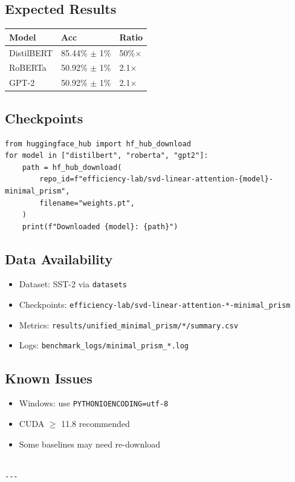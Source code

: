 \subsection{Expected Results}

\begin{table}[H]
\centering
\small
\begin{tabular}{lll}
\toprule
\textbf{Model} & \textbf{Acc} & \textbf{Ratio} \\
\midrule
DistilBERT & 85.44\% $\pm$ 1\% & 50\%$\times$ \\
RoBERTa & 50.92\% $\pm$ 1\% & 2.1$\times$ \\
GPT-2 & 50.92\% $\pm$ 1\% & 2.1$\times$ \\
\bottomrule
\end{tabular}
\end{table}

\subsection{Checkpoints}

\begin{lstlisting}
from huggingface_hub import hf_hub_download
for model in ["distilbert", "roberta", "gpt2"]:
    path = hf_hub_download(
        repo_id=f"efficiency-lab/svd-linear-attention-{model}-minimal_prism",
        filename="weights.pt",
    )
    print(f"Downloaded {model}: {path}")
\end{lstlisting}

\subsection{Data Availability}

\begin{itemize}
\item Dataset: SST-2 via \texttt{datasets}
\item Checkpoints: \texttt{efficiency-lab/svd-linear-attention-*-minimal\_prism}
\item Metrics: \texttt{results/unified\_minimal\_prism/*/summary.csv}
\item Logs: \texttt{benchmark\_logs/minimal\_prism\_*.log}

\end{itemize}
\subsection{Known Issues}

\begin{itemize}
\item Windows: use \texttt{PYTHONIOENCODING=utf-8}
\item CUDA $\ge$ 11.8 recommended
\item Some baselines may need re-download
\end{itemize}
\begin{lstlisting}

---
\end{lstlisting}
